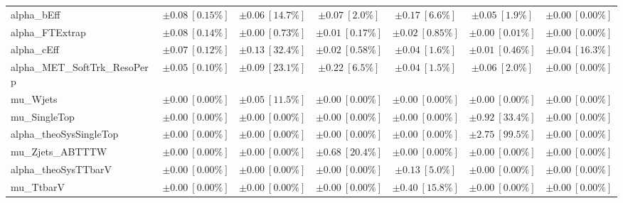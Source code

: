 \begin{sidewaystable}
\begin{center}
\begin{tabular*}{\textwidth}{@{\extracolsep{\fill}}lcccccc}
alpha\_bEff         & $\pm 0.08\ [0.15\%] $          & $\pm 0.06\ [14.7\%] $          & $\pm 0.07\ [2.0\%] $          & $\pm 0.17\ [6.6\%] $          & $\pm 0.05\ [1.9\%] $          & $\pm 0.00\ [0.00\%] $       \\
alpha\_FTExtrap         & $\pm 0.08\ [0.14\%] $          & $\pm 0.00\ [0.73\%] $          & $\pm 0.01\ [0.17\%] $          & $\pm 0.02\ [0.85\%] $          & $\pm 0.00\ [0.01\%] $          & $\pm 0.00\ [0.00\%] $       \\
alpha\_cEff         & $\pm 0.07\ [0.12\%] $          & $\pm 0.13\ [32.4\%] $          & $\pm 0.02\ [0.58\%] $          & $\pm 0.04\ [1.6\%] $          & $\pm 0.01\ [0.46\%] $          & $\pm 0.04\ [16.3\%] $       \\
alpha\_MET\_SoftTrk\_ResoPerp         & $\pm 0.05\ [0.10\%] $          & $\pm 0.09\ [23.1\%] $          & $\pm 0.22\ [6.5\%] $          & $\pm 0.04\ [1.5\%] $          & $\pm 0.06\ [2.0\%] $          & $\pm 0.00\ [0.00\%] $       \\
mu\_Wjets         & $\pm 0.00\ [0.00\%] $          & $\pm 0.05\ [11.5\%] $          & $\pm 0.00\ [0.00\%] $          & $\pm 0.00\ [0.00\%] $          & $\pm 0.00\ [0.00\%] $          & $\pm 0.00\ [0.00\%] $       \\
mu\_SingleTop         & $\pm 0.00\ [0.00\%] $          & $\pm 0.00\ [0.00\%] $          & $\pm 0.00\ [0.00\%] $          & $\pm 0.00\ [0.00\%] $          & $\pm 0.92\ [33.4\%] $          & $\pm 0.00\ [0.00\%] $       \\
alpha\_theoSysSingleTop         & $\pm 0.00\ [0.00\%] $          & $\pm 0.00\ [0.00\%] $          & $\pm 0.00\ [0.00\%] $          & $\pm 0.00\ [0.00\%] $          & $\pm 2.75\ [99.5\%] $          & $\pm 0.00\ [0.00\%] $       \\
mu\_Zjets\_ABTTTW         & $\pm 0.00\ [0.00\%] $          & $\pm 0.00\ [0.00\%] $          & $\pm 0.68\ [20.4\%] $          & $\pm 0.00\ [0.00\%] $          & $\pm 0.00\ [0.00\%] $          & $\pm 0.00\ [0.00\%] $       \\
alpha\_theoSysTTbarV         & $\pm 0.00\ [0.00\%] $          & $\pm 0.00\ [0.00\%] $          & $\pm 0.00\ [0.00\%] $          & $\pm 0.13\ [5.0\%] $          & $\pm 0.00\ [0.00\%] $          & $\pm 0.00\ [0.00\%] $       \\
mu\_TtbarV         & $\pm 0.00\ [0.00\%] $          & $\pm 0.00\ [0.00\%] $          & $\pm 0.00\ [0.00\%] $          & $\pm 0.40\ [15.8\%] $          & $\pm 0.00\ [0.00\%] $          & $\pm 0.00\ [0.00\%] $       \\

\end{tabular*}
\end{center}
\end{sidewaystable}
